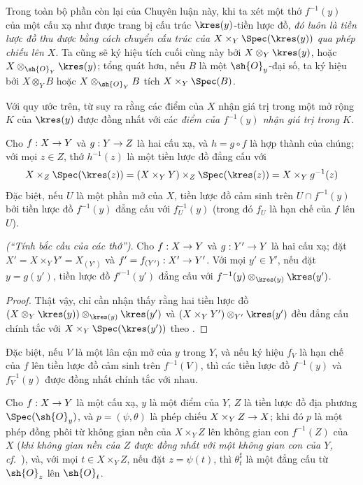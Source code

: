 \documentclass[oneside]{amsart}
\makeatletter
\newcommand{\ega@arrow}[2]{\mathchoice{#1}{#2}{#2}{#2}}
\renewcommand{\to}{\ega@arrow{\longrightarrow}{\rightarrow}}
\newcommand{\oldpage}[2][]{{\marginnote{\normalfont\textbf{#1}~|~#2}}\ignorespaces}
\let\EGAOriginalLabel\label
\renewcommand{\label}[1]{\phantomsection\EGAOriginalLabel{#1}}
\makeatother
\begin{document}
\begin{env}[3.6.2]
\label{I.3.6.2}
Trong toàn bộ phần còn lại của Chuyên luận này, khi ta xét một thớ $f^{-1}(y)$ của một cấu xạ như được trang bị cấu trúc $\kres(y)$-tiền lược đồ, \emph{đó luôn là tiền lược đồ thu được bằng cách chuyển cấu trúc của $X\times_Y\Spec(\kres(y))$ qua phép chiếu lên $X$}.
Ta cũng sẽ ký hiệu tích cuối cùng này bởi $X\otimes_Y\kres(y)$, hoặc $X\otimes_{\sh{O}_Y}\kres(y)$; tổng quát hơn, nếu $B$ là một $\sh{O}_y$-đại số, ta ký hiệu bởi $X\otimes_Y B$ hoặc $X\otimes_{\sh{O}_Y}B$ tích $X\times_Y\Spec(B)$.
\end{env}

Với quy ước trên, từ  suy ra rằng các điểm của $X$ nhận giá trị trong một mở rộng $K$ của $\kres(y)$ được đồng nhất với các \emph{điểm của $f^{-1}(y)$ nhận giá trị trong $K$}.

\begin{env}[3.6.3]
\label{I.3.6.3}
Cho $f:X\to Y$ và $g:Y\to Z$ là hai cấu xạ, và $h=g\circ f$ là hợp thành của chúng; với mọi $z\in Z$, thớ $h^{-1}(z)$ là một tiền lược đồ đẳng cấu với
\[
  X\times_Z\Spec(\kres(z))=(X\times_Y Y)\times_Z\Spec(\kres(z))=X\times_Y g^{-1}(z)
\]
\oldpage[I]{118}
Đặc biệt, nếu $U$ là một phần mở của $X$, tiền lược đồ cảm sinh trên $U\cap f^{-1}(y)$ bởi tiền lược đồ $f^{-1}(y)$ đẳng cấu với $f^{-1}_U(y)$ (trong đó $f_U$ là hạn chế của $f$ lên $U$).
\end{env}

\begin{proposition}[3.6.4]
\label{I.3.6.4}
\emph{(``Tính bắc cầu của các thớ'')}. Cho $f:X\to Y$ và $g:Y'\to Y$ là hai cấu xạ; đặt $X'=X\times_Y Y'=X_{(Y')}$ và $f'=f_{(Y')}:X'\to Y'$.
Với mọi $y'\in Y'$, nếu đặt $y=g(y')$, tiền lược đồ $f'^{-1}(y')$ đẳng cấu với $f^{-1}(y)\otimes_{\kres(y)}\kres(y')$.
\end{proposition}

\begin{proof}
Thật vậy, chỉ cần nhận thấy rằng hai tiền lược đồ $(X\otimes_Y\kres(y))\otimes_{\kres(y)}\kres(y')$ và $(X\times_Y Y')\otimes_{Y'}\kres(y')$ đều đẳng cấu chính tắc với $X\times_Y\Spec(\kres(y'))$ theo .
\end{proof}

Đặc biệt, nếu $V$ là một lân cận mở của $y$ trong $Y$, và nếu ký hiệu $f_V$ là hạn chế của $f$ lên tiền lược đồ cảm sinh trên $f^{-1}(V)$, thì các tiền lược đồ $f^{-1}(y)$ và $f^{-1}_V(y)$ được đồng nhất chính tắc với nhau.

\begin{proposition}[3.6.5]
\label{I.3.6.5}
Cho $f:X\to Y$ là một cấu xạ, $y$ là một điểm của $Y$, $Z$ là tiền lược đồ địa phương $\Spec(\sh{O}_y)$, và $p=(\psi,\theta)$ là phép chiếu $X\times_Y Z\to X$; khi đó $p$ là một phép đồng phôi từ không gian nền của $X\times_Y Z$ lên không gian con $f^{-1}(Z)$ của $X$ (\emph{khi không gian nền của $Z$ được đồng nhất với một không gian con của $Y$, cf.~}), và, với mọi $t\in X\times_Y Z$, nếu đặt $z=\psi(t)$, thì $\theta_t^\sharp$ là một đẳng cấu từ $\sh{O}_z$ lên $\sh{O}_t$.
\end{proposition}
\end{document}
